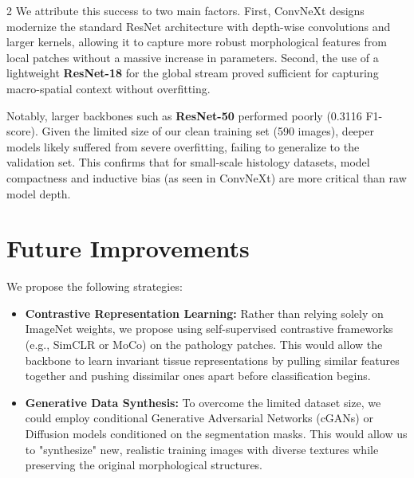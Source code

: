 \documentclass[11pt]{article}
\begin{document}
\begin{multicols}{2}
    We attribute this success to two main factors. First, ConvNeXt designs modernize the standard ResNet architecture with depth-wise convolutions and larger kernels, allowing it to capture more robust morphological features from local patches without a massive increase in parameters. Second, the use of a lightweight \textbf{ResNet-18} for the global stream proved sufficient for capturing macro-spatial context without overfitting.

    Notably, larger backbones such as \textbf{ResNet-50} performed poorly (0.3116 F1-score). Given the limited size of our clean training set (590 images), deeper models likely suffered from severe overfitting, failing to generalize to the validation set. This confirms that for small-scale histology datasets, model compactness and inductive bias (as seen in ConvNeXt) are more critical than raw model depth.

    \section{Future Improvements}
    We propose the following strategies:

    \begin{itemize}
        \item \textbf{Contrastive Representation Learning:} Rather than relying solely on ImageNet weights, we propose using self-supervised contrastive frameworks (e.g., SimCLR or MoCo) on the pathology patches. This would allow the backbone to learn invariant tissue representations by pulling similar features together and pushing dissimilar ones apart before classification begins.

        \item \textbf{Generative Data Synthesis:} To overcome the limited dataset size, we could employ conditional Generative Adversarial Networks (cGANs) or Diffusion models conditioned on the segmentation masks. This would allow us to "synthesize" new, realistic training images with diverse textures while preserving the original morphological structures.
    \end{itemize}
    
    
\end{multicols}
\appendix
\end{document}
